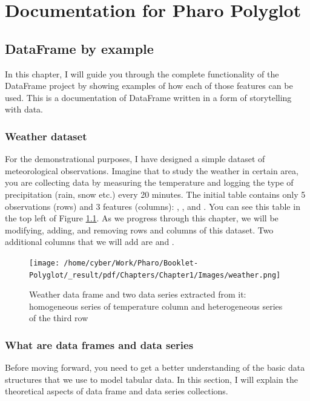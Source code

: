 \documentclass[10pt,twoside,english]{_support/latex/sbabook/sbabook}
\begin{document}
\frontmatter
\pagestyle{plain}

\tableofcontents*
\clearpage\listoffigures

\mainmatter

\part{Documentation for Pharo Polyglot}
\chapter{DataFrame by example}
In this chapter, I will guide you through the complete functionality of the DataFrame project by showing examples of how each of those features can be used. This is a documentation of DataFrame written in a form of storytelling with data.
\section{Weather dataset}\label{weatherDataset}
For the demonstrational purposes, I have designed a simple dataset of meteorological observations. Imagine that to study the weather in certain area, you are collecting data by measuring the temperature and logging the type of precipitation (rain, snow etc.) every 20 minutes. The initial table contains only 5 observations (rows) and 3 features (columns): , , and . You can see this table in the top left of Figure \ref{weatherDataFrame}. As we progress through this chapter, we will be modifying, adding, and removing rows and columns of this dataset. Two additional columns that we will add are  and .


\begin{figure}

\begin{center}
\texttt{[image: /home/cyber/Work/Pharo/Booklet-Polyglot/\_result/pdf/Chapters/Chapter1/Images/weather.png]}\caption{Weather data frame and two data series extracted from it: homogeneous series of temperature column and heterogeneous series of the third row\label{weatherDataFrame}}\end{center}
\end{figure}

\section{What are data frames and data series}
Before moving forward, you need to get a better understanding of the basic data structures that we use to model tabular data. In this section, I will explain the theoretical aspects of data frame and data series collections.
\end{document}
